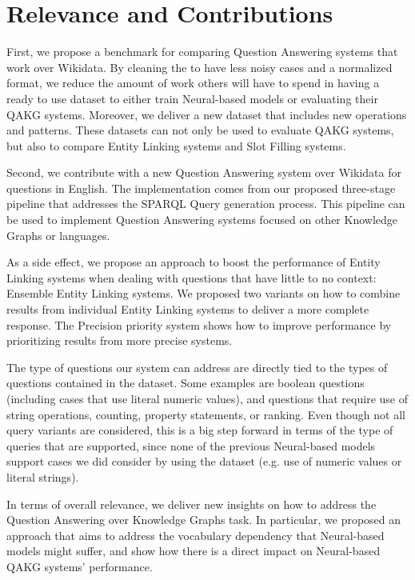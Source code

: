 \section{Relevance and Contributions}
\label{cap6:conclusions/relevanceContributions}
First, we propose a benchmark for comparing Question Answering systems that work over Wikidata. By 
cleaning the \LCQuADtwo{} to have less noisy cases and a normalized format, we reduce the amount of 
work others will have to spend in having a ready to use dataset to either train Neural-based models 
or evaluating their QAKG systems. Moreover, we deliver a new dataset that includes new \SPARQL{} 
operations and patterns. These datasets can not only be used to evaluate QAKG systems, but also to 
compare Entity Linking systems and Slot Filling systems.

Second, we contribute with a new Question Answering system over Wikidata for questions in English. 
The implementation comes from our proposed three-stage pipeline that addresses the SPARQL Query 
generation process. This pipeline can be used to implement Question Answering systems focused on 
other Knowledge Graphs or languages. 

As a side effect, we propose an approach to boost the performance of Entity Linking systems when 
dealing with questions that have little to no context: Ensemble Entity Linking systems. We proposed 
two variants on how to combine results from individual Entity Linking systems to deliver a more 
complete response. The Precision priority system shows how to improve performance by prioritizing 
results from more precise systems. 

The type of questions our system can address are directly tied to the types of questions contained in 
the \LCQuADtwo{} dataset. Some examples are boolean questions (including cases that use literal numeric 
values), and questions that require use of string operations, counting, property statements, or 
ranking. Even though not all query variants are considered, this is a big step forward in terms of 
the type of queries that are supported, since none of the previous Neural-based models support cases 
we did consider by using the \LCQuADtwo{} dataset (e.g. use of numeric values or literal strings). 

In terms of overall relevance, we deliver new insights on how to address the Question Answering over 
Knowledge Graphs task. In particular, we proposed an approach that aims to address the vocabulary 
dependency that Neural-based models might suffer, and show how there is a direct impact on 
Neural-based QAKG systems’ performance. 

